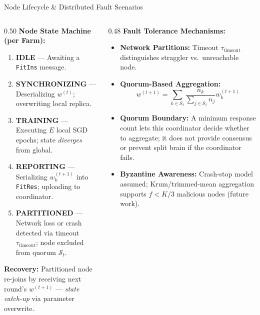 \documentclass[aspectratio=169]{beamer}
\begin{document}
\begin{frame}{Node Lifecycle \& Distributed Fault Scenarios}
    \begin{columns}[T]
        \begin{column}{0.50\textwidth}
            \textbf{Node State Machine (per Farm):}
            \vspace{0.1cm}
            \begin{enumerate}
                \item \textbf{IDLE} --- Awaiting a \texttt{FitIns} message.
                \item \textbf{SYNCHRONIZING} --- Deserializing $w^{(t)}$; overwriting local replica.
                \item \textbf{TRAINING} --- Executing $E$ local SGD epochs; state \textit{diverges} from global.
                \item \textbf{REPORTING} --- Serializing $w_k^{(t+1)}$ into \texttt{FitRes}; uploading to coordinator.
                \item \textbf{PARTITIONED} --- Network loss or crash detected via timeout $\tau_{\text{timeout}}$; node excluded from quorum $\mathcal{S}_t$.
            \end{enumerate}
            \vspace{0.1cm}
            \footnotesize \textbf{Recovery:} Partitioned node re-joins by receiving next round's $w^{(t+1)}$ --- \textit{state catch-up} via parameter overwrite.
        \end{column}
        \begin{column}{0.48\textwidth}
            \textbf{Fault Tolerance Mechanisms:}
            \begin{itemize}
                \item \textbf{Network Partitions:} Timeout $\tau_{\text{timeout}}$ distinguishes straggler vs.\ unreachable node.
                \item \textbf{Quorum-Based Aggregation:}
                {\footnotesize
                \[
                w^{(t+1)} = \sum_{k \in \mathcal{S}_t} \frac{n_k}{\sum_{j \in \mathcal{S}_t} n_j} w_k^{(t+1)}
                \]
                }
                \item \textbf{Quorum Boundary:} A minimum response count lets this coordinator decide whether to aggregate; it does not provide consensus or prevent split brain if the coordinator fails.
                \item \textbf{Byzantine Awareness:} Crash-stop model assumed; Krum/trimmed-mean aggregation supports $f < K/3$ malicious nodes (future work).
            \end{itemize}
        \end{column}
    \end{columns}
\end{frame}
\end{document}
